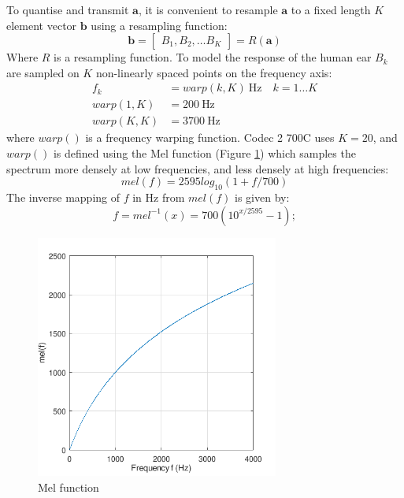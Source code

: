 \documentclass{article}
\begin{document}
{To quantise and transmit $\mathbf{a}$, it is convenient to resample $\mathbf{a}$ to a fixed length $K$ element vector $\mathbf{b}$ using a resampling function:
\begin{equation}
\mathbf{b} = \begin{bmatrix} B_1, B_2, \ldots B_K \end{bmatrix} = R(\mathbf{a})
\end{equation}
Where $R$ is a resampling function. To model the response of the human ear $B_k$  are sampled on $K$ non-linearly spaced points on the frequency axis:
\begin{equation}
\begin{split}
f_k &= warp(k,K) \ \textrm{Hz} \quad k=1 \ldots K \\
warp(1,K) &= 200 \ \textrm{Hz} \\
warp(K,K) &= 3700 \ \textrm{Hz}
\end{split}
\end{equation}
where $warp()$ is a frequency warping function. Codec 2 700C uses $K=20$, and $warp()$ is defined using the Mel function \cite[p 150]{o1997human} (Figure \ref{fig:mel_fhz}) which samples the spectrum more densely at low frequencies, and less densely at high frequencies:
\begin{equation} \label{eq:mel_f}
mel(f) = 2595log_{10}(1+f/700)
\end{equation}
The inverse mapping of $f$ in Hz from $mel(f)$ is given by:
\begin{equation} \label{eq:f_mel}
f = mel^{-1}(x) = 700(10^{x/2595} - 1);
\end{equation}

\begin{figure}[h]
\caption{Mel function}
\label{fig:mel_fhz}
\begin{center}
\includegraphics[width=8cm]{ratek_mel_fhz}
\end{center}
\end{figure}

}
\end{document}
